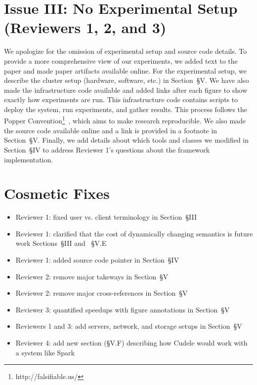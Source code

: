 \documentclass[onecolumn,conference]{IEEEtran}
\begin{document}
\section*{Issue III: No Experimental Setup (Reviewers 1, 2, and 3)}

We apologize for the omission of experimental setup and source code details. To
provide a more comprehensive view of our experiments, we added text to the
paper and made paper artifacts available online. For the experimental setup, we
describe the cluster setup (hardware, software, etc.) in Section~{\S}V.  We
have also made the infrastructure code available and added links after each
figure to show exactly how experiments are run.  This infrastructure code
contains scripts to deploy the system, run experiments, and gather results.
This process follows the Popper
Convention\footnote{http://falsifiable.us/}~\cite{jimenez_popper_2016}, which
aims to make research reproducible.  We also made the source code available
online and a link is provided in a footnote in Section~{\S}V. Finally, we add
details about which tools and classes we modified in Section~{\S}IV to address
Reviewer 1's questions about the framework implementation.



\section*{Cosmetic Fixes}
\begin{itemize}
  \item Reviewer 1: fixed user vs. client terminology in Section~{\S}III
  \item Reviewer 1: clarified that the cost of dynamically changing semantics is future work Sections~{\S}III and ~{\S}V.E
  \item Reviewer 1: added source code pointer in Section~{\S}IV
  \item Reviewer 2: remove major takeways in Section~{\S}V
  \item Reviewer 2: remove major cross-references in Section~{\S}V
  \item Reviewer 3: quantified speedups with figure annotations in Section~{\S}V
  \item Reviewers 1 and 3: add servers, network, and storage setups in Section~{\S}V
  \item Reviewer 4: add new section ({\S}V.F) describing how Cudele would work with a system like Spark
\end{itemize}



\end{document}
